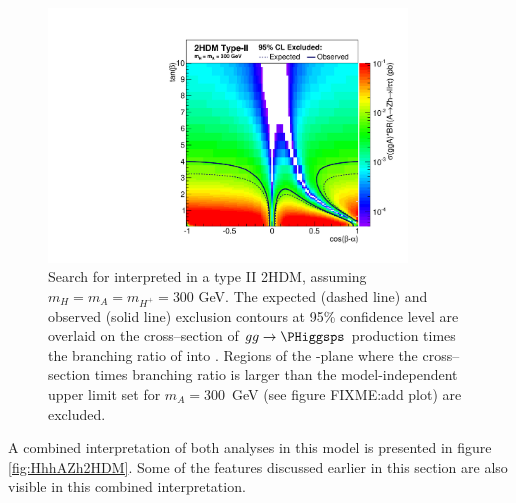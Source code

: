 \begin{figure}[h!]
\begin{center}
\includegraphics[width=0.85\textwidth]{Hhh/Plots/AZh2HDM.pdf}
\caption{Search for \AtoZhtolltautau interpreted in a type II 
2HDM, assuming $m_{H} = m_{A} = m_{H^{+}} = 300$ GeV. The expected (dashed line)
and observed (solid line) exclusion contours at 95\% confidence level are overlaid
on the cross--section of $gg\rightarrow \PHiggsps$ production
times the branching ratio of \PHiggsps into \Zhtolltautau.
Regions of the \cosba-\tanb plane where the cross--section times branching
ratio is larger than the model-independent upper limit set for $m_{A} = 300 $~GeV 
(see figure FIXME:add plot) are excluded.}
\label{fig:AZh2HDMOverlaid}
\end{center}
\end{figure}

A combined interpretation of both analyses in this model is presented
in figure \ref{fig:HhhAZh2HDM}. Some of the features discussed earlier
in this section are also visible in this combined interpretation.

